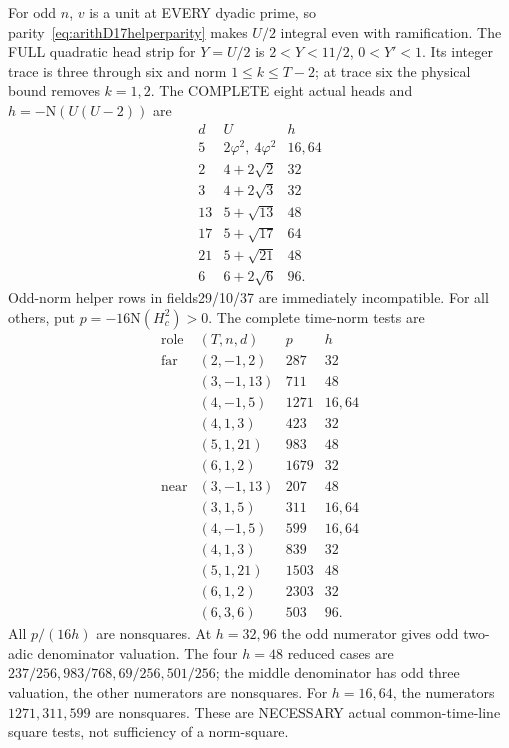 \documentclass[11pt]{article}
\begin{document}
For odd \(n\), \(v\) is a unit at EVERY dyadic
prime, so parity~\eqref{eq:arithD17helperparity}
makes \(U/2\) integral even with ramification.
The FULL quadratic head strip for \(Y=U/2\)
is \(2<Y<11/2\), \(0<Y'<1\).
Its integer trace is three through six and
norm \(1\le k\le T-2\); at trace six the
physical bound removes \(k=1,2\).
The COMPLETE eight actual heads and
\(h=-\mathrm N(U(U-2))\) are
\[
\begin{array}{c|c|c}
 d&U&h\\ \hline
5&2\varphi^2,\ 4\varphi^2&16,64\\
2&4+2\sqrt2&32\\
3&4+2\sqrt3&32\\
13&5+\sqrt{13}&48\\
17&5+\sqrt{17}&64\\
21&5+\sqrt{21}&48\\
6&6+2\sqrt6&96 .
\end{array}
\]
Odd-norm helper rows in fields29/10/37 are
immediately incompatible.
For all others, put
\(p=-16\mathrm N(H_c^2)>0\).
The complete time-norm tests are
\[
\begin{array}{c|c|r|l}
 \text{role}&(T,n,d)&p&h\\ \hline
 \text{far}&(2,-1,2)&287&32\\
 &(3,-1,13)&711&48\\
 &(4,-1,5)&1271&16,64\\
 &(4,1,3)&423&32\\
 &(5,1,21)&983&48\\
 &(6,1,2)&1679&32\\
 \text{near}&(3,-1,13)&207&48\\
 &(3,1,5)&311&16,64\\
 &(4,-1,5)&599&16,64\\
 &(4,1,3)&839&32\\
 &(5,1,21)&1503&48\\
 &(6,1,2)&2303&32\\
 &(6,3,6)&503&96 .
\end{array}
\]
All \(p/(16h)\) are nonsquares.
At \(h=32,96\) the odd numerator gives odd
two-adic denominator valuation.
The four \(h=48\) reduced cases are
\(237/256,983/768,69/256,501/256\);
the middle denominator has odd three valuation,
the other numerators are nonsquares.
For \(h=16,64\), the numerators
\(1271,311,599\) are nonsquares.
These are NECESSARY actual common-time-line
square tests, not sufficiency of a norm-square.
\end{document}
